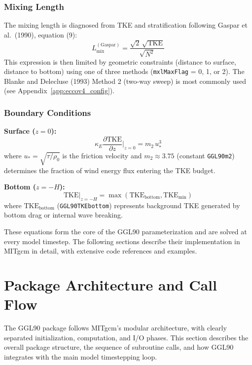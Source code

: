 \documentclass[12pt,letterpaper]{article}
\newcommand{\TKE}{\mathrm{TKE}}
\newcommand{\KE}{\kappa_E}
\newcommand{\Lmix}{L_{\mathrm{mix}}}
\begin{document}
\subsubsection{Mixing Length}

The mixing length is diagnosed from TKE and stratification following Gaspar
et al.\ (1990), equation (9):
\begin{equation}
\Lmix^{\mathrm{(Gaspar)}} = \frac{\sqrt{2} \, \sqrt{\TKE}}{\sqrt{N^2}}
\label{eq:l_gaspar}
\end{equation}
This expression is then limited by geometric constraints (distance to surface,
distance to bottom) using one of three methods (\texttt{mxlMaxFlag} = 0, 1, or 2).
The Blanke and Delecluse (1993) Method 2 (two-way sweep) is most commonly used
(see Appendix~\ref{app:eccov4_config}).

\subsubsection{Boundary Conditions}

\textbf{Surface ($z = 0$):}
\begin{equation}
\KE \frac{\partial \TKE}{\partial z}\bigg|_{z=0} = m_2 \, u_*^3
\label{eq:bc_surface}
\end{equation}
where $u_* = \sqrt{\tau / \rho_0}$ is the friction velocity and $m_2 \approx
3.75$ (constant \texttt{GGL90m2}) determines the fraction of wind energy flux
entering the TKE budget.

\textbf{Bottom ($z = -H$):}
\begin{equation}
\TKE\big|_{z=-H} = \max(\TKE_{\mathrm{bottom}}, \TKE_{\mathrm{min}})
\label{eq:bc_bottom}
\end{equation}
where $\TKE_{\mathrm{bottom}}$ (\texttt{GGL90TKEbottom}) represents background
TKE generated by bottom drag or internal wave breaking.

These equations form the core of the GGL90 parameterization and are solved at
every model timestep. The following sections describe their implementation in
MITgcm in detail, with extensive code references and examples.

\section{Package Architecture and Call Flow}

The GGL90 package follows MITgcm's modular architecture, with clearly separated
initialization, computation, and I/O phases. This section describes the overall
package structure, the sequence of subroutine calls, and how GGL90 integrates
with the main model timestepping loop.
\end{document}

